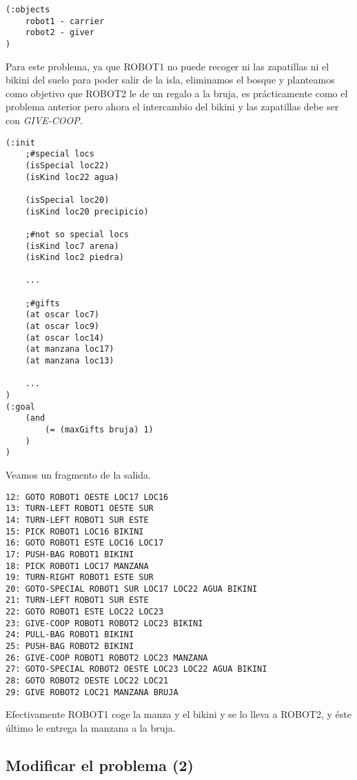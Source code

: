 \documentclass{article}
\newcommand{\img}[1]{
\noindent\makebox[0.9\textwidth][c]{\texttt{[image: \#1]}}%
}
\begin{document}
\begin{lstlisting}
(:objects 
    robot1 - carrier
    robot2 - giver
)
\end{lstlisting}

	Para este problema, ya que ROBOT1 no puede recoger ni las zapatillas ni el bikini del suelo para poder salir de la isla, eliminamos el bosque y planteamos como objetivo que ROBOT2 le de un regalo a la bruja, es prácticamente como el problema anterior pero ahora el intercambio del bikini y las zapatillas debe ser con \emph{GIVE-COOP}.
	
\begin{lstlisting}
(:init
	;#special locs
    (isSpecial loc22)
    (isKind loc22 agua)

    (isSpecial loc20)
    (isKind loc20 precipicio)

    ;#not so special locs
    (isKind loc7 arena)
    (isKind loc2 piedra)
    
    ...
    
    ;#gifts
    (at oscar loc7)
    (at oscar loc9)
    (at oscar loc14)
    (at manzana loc17)
    (at manzana loc13)
	
	...
)
(:goal 
    (and
        (= (maxGifts bruja) 1)
    )
)   
\end{lstlisting}

\img{img/map7}

Veamos un fragmento de la salida.

\begin{lstlisting}
12: GOTO ROBOT1 OESTE LOC17 LOC16
13: TURN-LEFT ROBOT1 OESTE SUR
14: TURN-LEFT ROBOT1 SUR ESTE
15: PICK ROBOT1 LOC16 BIKINI
16: GOTO ROBOT1 ESTE LOC16 LOC17
17: PUSH-BAG ROBOT1 BIKINI
18: PICK ROBOT1 LOC17 MANZANA
19: TURN-RIGHT ROBOT1 ESTE SUR
20: GOTO-SPECIAL ROBOT1 SUR LOC17 LOC22 AGUA BIKINI
21: TURN-LEFT ROBOT1 SUR ESTE
22: GOTO ROBOT1 ESTE LOC22 LOC23
23: GIVE-COOP ROBOT1 ROBOT2 LOC23 BIKINI
24: PULL-BAG ROBOT1 BIKINI
25: PUSH-BAG ROBOT2 BIKINI
26: GIVE-COOP ROBOT1 ROBOT2 LOC23 MANZANA
27: GOTO-SPECIAL ROBOT2 OESTE LOC23 LOC22 AGUA BIKINI
28: GOTO ROBOT2 OESTE LOC22 LOC21
29: GIVE ROBOT2 LOC21 MANZANA BRUJA
\end{lstlisting}

	Efectivamente ROBOT1 coge la manza y el bikini y se lo lleva a ROBOT2, y éste último le entrega la manzana a la bruja.
\subsection{Modificar el problema (2)}
\end{document}
